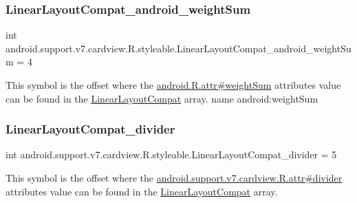 \subsubsection{\texorpdfstring{Linear\+Layout\+Compat\+\_\+android\+\_\+weight\+Sum}{LinearLayoutCompat\_android\_weightSum}}
{\footnotesize\ttfamily int android.\+support.\+v7.\+cardview.\+R.\+styleable.\+Linear\+Layout\+Compat\+\_\+android\+\_\+weight\+Sum = 4\hspace{0.3cm}{\ttfamily [static]}}

This symbol is the offset where the \hyperlink{}{android.\+R.\+attr\#weight\+Sum} attribute\textquotesingle{}s value can be found in the \hyperlink{classandroid_1_1support_1_1v7_1_1cardview_1_1R_1_1styleable_a700813433e97ff82dc1f2263b2072586}{Linear\+Layout\+Compat} array.  name android\+:weight\+Sum \mbox{\label{classandroid_1_1support_1_1v7_1_1cardview_1_1R_1_1styleable_ae493358d79f8ffabc299fa9e157f0537}} 
\subsubsection{\texorpdfstring{Linear\+Layout\+Compat\+\_\+divider}{LinearLayoutCompat\_divider}}
{\footnotesize\ttfamily int android.\+support.\+v7.\+cardview.\+R.\+styleable.\+Linear\+Layout\+Compat\+\_\+divider = 5\hspace{0.3cm}{\ttfamily [static]}}

This symbol is the offset where the \hyperlink{classandroid_1_1support_1_1v7_1_1cardview_1_1R_1_1attr_af372fbb85ebef799e994b3e8ddd80ffc}{android.\+support.\+v7.\+cardview.\+R.\+attr\#divider} attribute\textquotesingle{}s value can be found in the \hyperlink{classandroid_1_1support_1_1v7_1_1cardview_1_1R_1_1styleable_a700813433e97ff82dc1f2263b2072586}{Linear\+Layout\+Compat} array.

